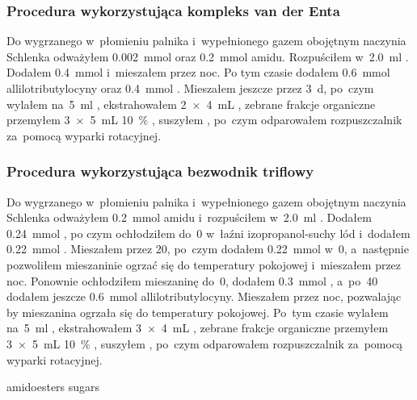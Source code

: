 \subsubsection{Procedura wykorzystująca kompleks van der Enta}
Do wygrzanego w~płomieniu palnika i~wypełnionego gazem obojętnym naczynia Schlenka odważyłem
  \SI{0.002}{\mmol}  oraz \SI{0.2}{\mmol} amidu.
Rozpuściłem w~\SI{2.0}{\ml} .
Dodałem \SI{0.4}{\mmol}  i~mieszałem przez noc.
Po tym czasie dodałem \SI{0.6}{\mmol} allilotributylocyny oraz \SI{0.4}{\mmol} .
Mieszałem jeszcze przez \SI{3}{\day}, po~czym wylałem na~\SI{5}{\ml} ,
  ekstrahowałem \SI[product-units = single]{2 x 4}{\mL} , zebrane frakcje organiczne
  przemyłem \SI[product-units = single]{3 x 5}{\mL} \SI{10}{\percent} ,
  suszyłem , po~czym odparowałem rozpuszczalnik za~pomocą wyparki rotacyjnej.

\subsubsection{Procedura wykorzystująca bezwodnik triflowy}
Do wygrzanego w~płomieniu palnika i~wypełnionego gazem obojętnym naczynia Schlenka odważyłem
  \SI{0.2}{\mmol} amidu i~rozpuściłem w~\SI{2.0}{\ml} .
Dodałem \SI{0.24}{\mmol} , po czym ochłodziłem do~\SI{0}{\degC}
  w~łaźni izopropanol-suchy lód i~dodałem \SI{0.22}{\mmol} .
Mieszałem przez \SI{20}{\min}, po~czym dodałem \SI{0.22}{\mmol}  w~\SI{0}{\degC},
  a~następnie pozwoliłem mieszaninie ogrzać się do temperatury pokojowej i~mieszałem przez noc.
Ponownie ochłodziłem mieszaninę do~\SI{0}{\degC}, dodałem \SI{0.3}{\mmol} ,
  a~po~\SI{40}{\min} dodałem jeszcze \SI{0.6}{\mmol} allilotributylocyny.
Mieszałem przez noc, pozwalając by mieszanina ogrzała się do temperatury pokojowej.
Po~tym czasie wylałem na~\SI{5}{\ml} ,
  ekstrahowałem \SI[product-units = single]{3 x 4}{\mL} , zebrane frakcje organiczne
  przemyłem \SI[product-units = single]{3 x 5}{\mL} \SI{10}{\percent} ,
  suszyłem , po~czym odparowałem rozpuszczalnik za~pomocą wyparki rotacyjnej.

{amidoesters}
{sugars}
